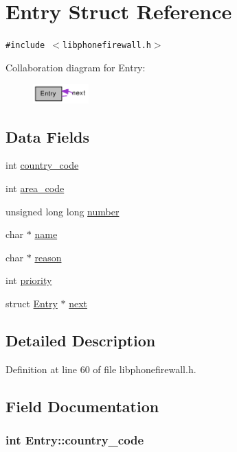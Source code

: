\hypertarget{structEntry}{
\section{Entry Struct Reference}
\label{structEntry}
}
{\tt \#include $<$libphonefirewall.h$>$}

Collaboration diagram for Entry:\nopagebreak
\begin{figure}[H]
\begin{center}
\leavevmode
\includegraphics[width=61pt]{structEntry__coll__graph}
\end{center}
\end{figure}
\subsection*{Data Fields}
\begin{CompactItemize}
\item 
int \hyperlink{structEntry_138b4e79687ff5ff6de4554db0f061fd}{country\_\-code}
\item 
int \hyperlink{structEntry_9de7b96e5b65796bd35e9dc730dcd8b3}{area\_\-code}
\item 
unsigned long long \hyperlink{structEntry_1f2177afed89936f82c130ae13fb107c}{number}
\item 
char $\ast$ \hyperlink{structEntry_272e382d3efed5f970c7939742ec9603}{name}
\item 
char $\ast$ \hyperlink{structEntry_2082cdbb815dfa8b81309cd395d32986}{reason}
\item 
int \hyperlink{structEntry_85af261b3171c257892b54a7200da061}{priority}
\item 
struct \hyperlink{structEntry}{Entry} $\ast$ \hyperlink{structEntry_08cba741f383cd7da0f3ab9aee6e3cd5}{next}
\end{CompactItemize}


\subsection{Detailed Description}


Definition at line 60 of file libphonefirewall.h.

\subsection{Field Documentation}
\hypertarget{structEntry_138b4e79687ff5ff6de4554db0f061fd}{
\subsubsection{\setlength{\rightskip}{0pt plus 5cm}int {\bf Entry::country\_\-code}}}
\label{structEntry_138b4e79687ff5ff6de4554db0f061fd}




